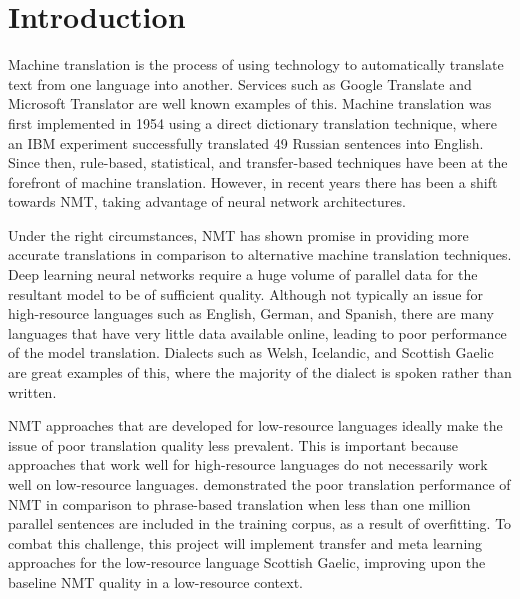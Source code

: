 \chapter{Introduction}
\label{introduction}
\clearpage
Machine translation is the process of using technology to automatically translate text from one language into another. Services such as Google Translate and Microsoft Translator are well known examples of this. 
Machine translation was first implemented in 1954 using a direct dictionary translation technique, where an IBM experiment successfully translated 49 Russian sentences into English.
Since then, rule-based, statistical, and transfer-based techniques have been at the forefront of machine translation. However, in recent years there has been a shift towards \Gls{NMT}, taking advantage of neural network architectures.

Under the right circumstances, \acrshort{NMT} has shown promise in providing more accurate translations in comparison to alternative machine translation techniques. Deep learning neural networks require a huge volume of parallel data for the resultant model to be of sufficient quality. Although not typically an issue for high-resource languages such as English, German, and Spanish, there are many languages that have very little data available online, leading to poor performance of the model translation. Dialects such as Welsh, Icelandic, and Scottish Gaelic are great examples of this, where the majority of the dialect is spoken rather than written.

\acrshort{NMT} approaches that are developed for low-resource languages ideally make the issue of poor translation quality less prevalent. This is important because approaches that work well for high-resource languages do not necessarily work well on low-resource languages. \cite{koehn_six_2017} demonstrated the poor translation performance of \acrshort{NMT} in comparison to phrase-based translation when less than one million parallel sentences are included in the training corpus, as a result of overfitting. To combat this challenge, this project will implement transfer and meta learning approaches for the low-resource language Scottish Gaelic, improving upon the baseline \acrshort{NMT} quality in a low-resource context.


